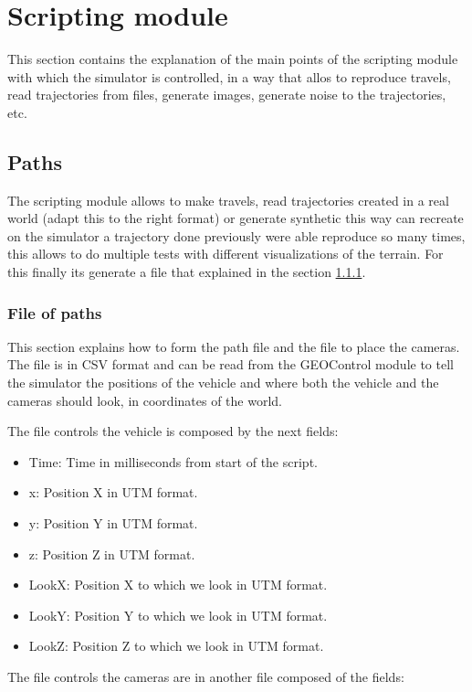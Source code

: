 \documentclass[10pt,a4paper,twocolumn,twoside]{article}
\begin{document}
\section{Scripting module}
\label{modulescript}

This section contains the explanation of the main points of the scripting module with which the simulator is controlled, in a way that allos to reproduce travels, read trajectories from files, generate images, generate noise to the trajectories, etc.

\subsection{Paths}
The scripting module allows to make travels, read trajectories created in a real world (adapt this to the right format) or generate synthetic this way can recreate on the simulator a trajectory done previously were able reproduce so many times, this allows to do multiple tests with different visualizations of the terrain. For this finally its generate a file that explained in the section \ref{file-trajectories}.

\subsubsection{File of paths}
\label{file-trajectories}
This section explains how to form the path file and the file to place the cameras. The file is in CSV format and can be read from the GEOControl module to tell the simulator the positions of the vehicle and where both the vehicle and the cameras should look, in coordinates of the world.

The file controls the vehicle is composed by the next fields:

\begin{itemize}
\item Time: Time in milliseconds from start of the script.
\item x: Position X in UTM format.
\item y: Position Y in UTM format.
\item z: Position Z in UTM format.
\item LookX: Position X to which we look in UTM format.
\item LookY: Position Y to which we look in UTM format.
\item LookZ: Position Z to which we look in UTM format.
\end{itemize}

The file controls the cameras are in another file composed of the fields:
\end{document}
